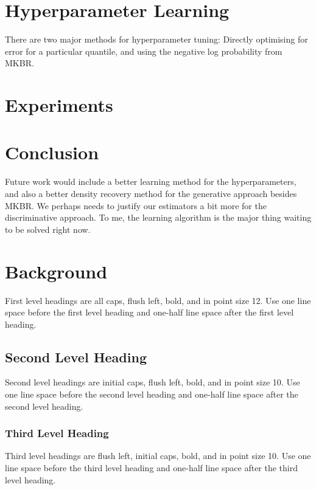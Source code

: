\documentclass[twoside]{article} \usepackage{aistats2017}
\newcommand{\warn}[1]{{\color{red} #1}}
\begin{document}
\section{Hyperparameter Learning}

	\warn{There are two major methods for hyperparameter tuning: Directly optimising for error for a particular quantile, and using the negative log probability from MKBR.}
	
\section{Experiments}

\section{Conclusion}

	\warn{Future work would include a better learning method for the hyperparameters, and also a better density recovery method for the generative approach besides MKBR. We perhaps needs to justify our estimators a bit more for the discriminative approach. To me, the learning algorithm is the major thing waiting to be solved right now.}
	
\newpage

\section{Background}

First level headings are all caps, flush left, bold, and in point size
12. Use one line space before the first level heading and one-half line space
after the first level heading.

\subsection{Second Level Heading}

Second level headings are initial caps, flush left, bold, and in point
size 10. Use one line space before the second level heading and one-half line
space after the second level heading.

\subsubsection{Third Level Heading}

Third level headings are flush left, initial caps, bold, and in point
size 10. Use one line space before the third level heading and one-half line
space after the third level heading.
\end{document}
